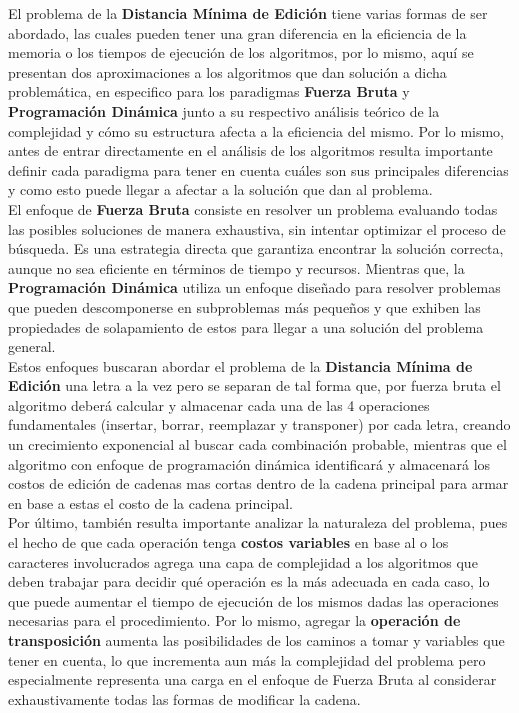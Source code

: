 El problema de la \textbf{Distancia Mínima de Edición} tiene varias formas de ser abordado, las cuales pueden tener una gran diferencia en la eficiencia de la memoria o los tiempos de ejecución de los algoritmos, por lo mismo, aquí se presentan dos aproximaciones a los algoritmos que dan solución a dicha problemática, en especifico para los paradigmas \textbf{Fuerza Bruta} y \textbf{Programación Dinámica} junto a su respectivo análisis teórico de la complejidad y cómo su estructura afecta a la eficiencia del mismo. Por lo mismo, antes de entrar directamente en el análisis de los algoritmos resulta importante definir cada paradigma para tener en cuenta cuáles son sus principales diferencias y como esto puede llegar a afectar a la solución que dan al problema.\\

El enfoque de \textbf{Fuerza Bruta} consiste en resolver un problema evaluando todas las posibles soluciones de manera exhaustiva, sin intentar optimizar el proceso de búsqueda. Es una estrategia directa que garantiza encontrar la solución correcta, aunque no sea eficiente en términos de tiempo y recursos. Mientras que, la \textbf{Programación Dinámica} utiliza un enfoque diseñado para resolver problemas que pueden descomponerse en subproblemas más pequeños y que exhiben las propiedades de solapamiento de estos para llegar a una solución del problema general.\\

Estos enfoques buscaran abordar el problema de la \textbf{Distancia Mínima de Edición} una letra a la vez pero se separan de tal forma que, por fuerza bruta el algoritmo deberá calcular y almacenar cada una de las 4 operaciones fundamentales (insertar, borrar, reemplazar y transponer) por cada letra, creando un crecimiento exponencial al buscar cada combinación probable, mientras que el algoritmo con enfoque de programación dinámica identificará y almacenará los costos de edición de cadenas mas cortas dentro de la cadena principal para armar en base a estas el costo de la cadena principal.\\

Por último, también resulta importante analizar la naturaleza del problema, pues el hecho de que cada operación tenga \textbf{costos variables} en base al o los caracteres involucrados agrega una capa de complejidad a los algoritmos que deben trabajar para decidir qué operación es la más adecuada en cada caso, lo que puede aumentar el tiempo de ejecución de los mismos dadas las operaciones necesarias para el procedimiento. Por lo mismo, agregar la \textbf{operación de transposición} aumenta las posibilidades de los caminos a tomar y variables que tener en cuenta, lo que incrementa aun más la complejidad del problema pero especialmente representa una carga en el enfoque de Fuerza Bruta al considerar exhaustivamente todas las formas de modificar la cadena.\\
